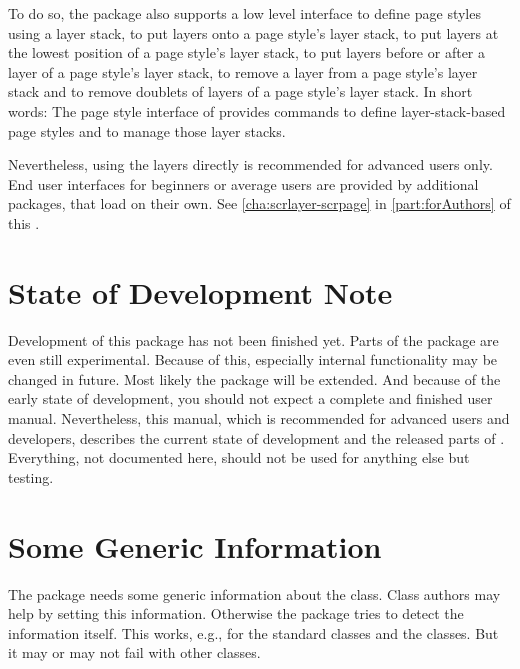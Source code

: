 To do so, the package also supports a low level interface to define page
styles using a layer stack, to put layers onto a page style's layer stack, to
put layers at the lowest position of a page style's layer stack, to put layers
before or after a layer of a page style's layer stack, to remove a layer from
a page style's layer stack and to remove doublets of layers of a page style's
layer stack. In short words: The page style interface of 
provides commands to define layer-stack-based page styles and to manage those
layer stacks.

Nevertheless, using the layers directly is recommended for advanced users only.
End user interfaces for beginners or average users are provided by additional
packages, that load  on their own. See
\autoref{cha:scrlayer-scrpage} in \autoref{part:forAuthors} of this
.

\section{State of Development Note}
\label{sec:scrlayer.draft}

Development of this package has not been finished yet. Parts of the package
are even still experimental. Because of this, especially internal
functionality may be changed in future. Most likely the package will be
extended. And because of the early state of development, you should not expect
a complete and finished user manual. Nevertheless, this manual, which is
recommended for advanced users and developers, describes the current state of
development and the released parts of . Everything, not
documented here, should not be used for anything else but testing.


\section{Some Generic Information}
\label{sec:scrlayer.generic}

The package needs some generic information about the class. Class authors may
help  by setting this information. Otherwise the package tries
to detect the information itself. This works, e.g., for the standard classes
and the \KOMAScript{} classes. But it may or may not fail with other classes.

